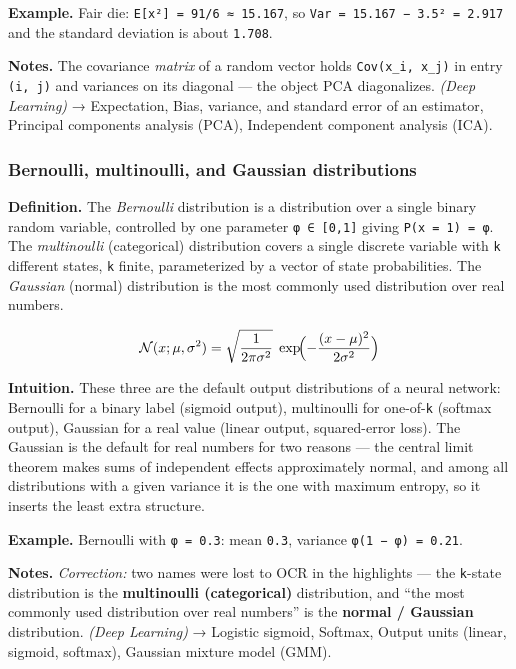 \documentclass[
  10pt,
  letterpaper,
  onecolumn]{article}
\begin{document}
\textbf{Example.} Fair die:
\texttt{E{[}x²{]}\ =\ 91/6\ ≈\ 15.167}, so
\texttt{Var\ =\ 15.167\ −\ 3.5²\ =\ 2.917} and the standard deviation is
about \texttt{1.708}.

\textbf{Notes.} The covariance \emph{matrix} of a random vector holds
\texttt{Cov(x\_i,\ x\_j)} in entry \texttt{(i,\ j)} and variances on its
diagonal --- the object PCA diagonalizes. \emph{(Deep Learning)} →
Expectation, Bias, variance, and standard error of an estimator,
Principal components analysis (PCA), Independent component analysis
(ICA).

\hypertarget{bernoulli-multinoulli-and-gaussian-distributions}{%
\subsubsection{Bernoulli, multinoulli, and Gaussian
distributions}\label{bernoulli-multinoulli-and-gaussian-distributions}}

\textbf{Definition.} The \emph{Bernoulli} distribution is a distribution
over a single binary random variable, controlled by one parameter
\texttt{φ\ ∈\ {[}0,1{]}} giving \texttt{P(x\ =\ 1)\ =\ φ}. The
\emph{multinoulli} (categorical) distribution covers a single discrete
variable with \texttt{k} different states, \texttt{k} finite,
parameterized by a vector of state probabilities. The \emph{Gaussian}
(normal) distribution is the most commonly used distribution over real
numbers.

\begin{equation*}
\mathcal{N}(x;\mu,\sigma^{2})=\sqrt{\frac{1}{2\pi\sigma^{2}}}\;\exp\!\Bigl(-\frac{(x-\mu)^{2}}{2\sigma^{2}}\Bigr)
\end{equation*}

\textbf{Intuition.} These three are the default output distributions of
a neural network: Bernoulli for a binary label (sigmoid output),
multinoulli for one-of-\texttt{k} (softmax output), Gaussian for a real
value (linear output, squared-error loss). The Gaussian is the default
for real numbers for two reasons --- the central limit theorem makes
sums of independent effects approximately normal, and among all
distributions with a given variance it is the one with maximum entropy,
so it inserts the least extra structure.

\textbf{Example.} Bernoulli with \texttt{φ\ =\ 0.3}: mean \texttt{0.3},
variance \texttt{φ(1\ −\ φ)\ =\ 0.21}.

\textbf{Notes.} \emph{Correction:} two names were lost to OCR in the
highlights --- the \texttt{k}-state distribution is the
\textbf{multinoulli (categorical)} distribution, and ``the most commonly
used distribution over real numbers'' is the \textbf{normal / Gaussian}
distribution. \emph{(Deep Learning)} → Logistic sigmoid, Softmax, Output
units (linear, sigmoid, softmax), Gaussian mixture model (GMM).
\end{document}
